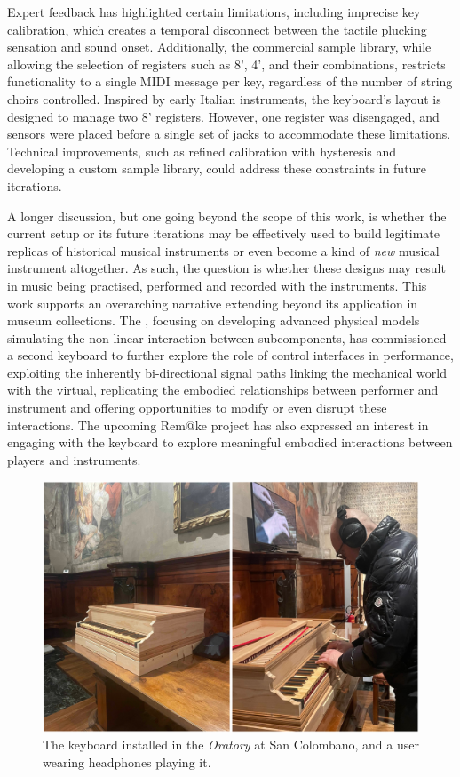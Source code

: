 Expert feedback has highlighted certain limitations, including imprecise key calibration, which creates a temporal disconnect between the tactile plucking sensation and sound onset. Additionally, the commercial sample library, while allowing the selection of registers such as 8', 4', and their combinations, restricts functionality to a single MIDI message per key, regardless of the number of string choirs controlled. Inspired by early Italian instruments, the keyboard's layout is designed to manage two 8' registers. However, one register was disengaged, and sensors were placed before a single set of jacks to accommodate these limitations. Technical improvements, such as refined calibration with hysteresis and developing a custom sample library, could address these constraints in future iterations.

A longer discussion, but one going beyond the scope of this work, is whether the current setup or its future iterations may be effectively used to build legitimate replicas of historical musical instruments or even become a kind of \emph{new} musical instrument altogether. As such, the question is whether these designs may result in music being practised, performed and recorded with the instruments. This work supports an overarching narrative extending beyond its application in museum collections. The , focusing on developing advanced physical models simulating the non-linear interaction between subcomponents, has commissioned a second keyboard to further explore the role of control interfaces in performance, exploiting the inherently bi-directional signal paths linking the mechanical world with the virtual, replicating the embodied relationships between performer and instrument and offering opportunities to modify or even disrupt these interactions. The upcoming Rem@ke project \cite{remake1} has also expressed an interest in engaging with the keyboard to explore meaningful embodied interactions between players and instruments. 

\begin{figure}[b]
\centering
\includegraphics[width = \linewidth]{src/images/keyboardMuseum.JPEG}
\caption{The keyboard installed in the \emph{Oratory} at San Colombano, and a user wearing headphones playing it.}\label{fig:oratory}
\end{figure}


